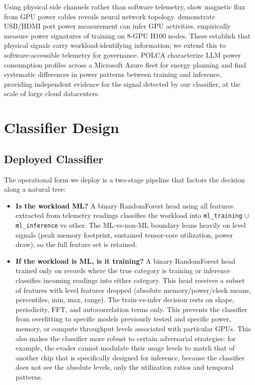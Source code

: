 Using physical side channels rather than software telemetry, \citet{maia2022} show magnetic flux from GPU power cables reveals neural network topology. \citet{arefin2025} demonstrate USB/HDMI port power measurement can infer GPU activities. \citet{latif2025} empirically measure power signatures of training on 8-GPU H100 nodes. These establish that physical signals carry workload-identifying information; we extend this to software-accessible telemetry for governance. POLCA \citep{patel2023} characterize LLM power consumption profiles across a Microsoft Azure fleet for energy planning and find systematic differences in power patterns between training and inference, providing independent evidence for the signal detected by our classifier, at the scale of large cloud datacenters.

\FloatBarrier
\section{Classifier Design}
\label{sec:clfdesign}

\subsection{Deployed Classifier}

The operational form we deploy is a two-stage pipeline that factors the decision along a natural tree:

\begin{itemize}\itemsep2pt
  \item \textbf{Is the workload ML?} A binary RandomForest head using all features extracted from telemetry readings classifies the workload into \texttt{ml\_training} $\cup$ \texttt{ml\_inference} vs other. The ML-vs-non-ML boundary leans heavily on level signals (peak memory footprint, sustained tensor-core utilization, power draw), so the full feature set is retained.
  \item \textbf{If the workload is ML, is it training?} A binary RandomForest head trained only on records where the true category is training or inference classifies incoming readings into either category. This head receives a subset of features with level features dropped (absolute memory/power/clock means, percentiles, min, max, range). The train-vs-infer decision rests on shape, periodicity, FFT, and autocorrelation terms only. This prevents the classifier from overfitting to specific models previously tested and specific power, memory, or compute throughput levels associated with particular GPUs. This also makes the classifier more robust to certain adversarial strategies: for example, the evader cannot modulate their usage levels to match that of another chip that is specifically designed for inference, because the classifier does not see the absolute levels, only the utilization ratios and temporal patterns.
\end{itemize}

